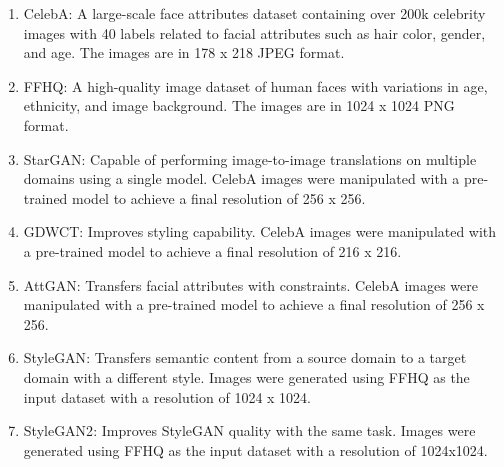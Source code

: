         \begin{enumerate}
            \item CelebA\cite{7410782}: A large-scale face attributes dataset containing over 200k celebrity images with 40 labels related to facial attributes such as hair color, gender, and age. The images are in 178 x 218 JPEG format.
            
            \item FFHQ\cite{NVlabs_ffhq_dataset}: A high-quality image dataset of human faces with variations in age, ethnicity, and image background. The images are in 1024 x 1024 PNG format.
            
            \item StarGAN\cite{choi2018stargan}: Capable of performing image-to-image translations on multiple domains using a single model. CelebA images were manipulated with a pre-trained model to achieve a final resolution of 256 x 256.
            
            \item GDWCT\cite{cho2019imagetoimage}: Improves styling capability. CelebA images were manipulated with a pre-trained model to achieve a final resolution of 216 x 216.
    
            \item AttGAN\cite{8718508}: Transfers facial attributes with constraints. CelebA images were manipulated with a pre-trained model to achieve a final resolution of 256 x 256.
        
            \item StyleGAN\cite{Karras_2020_CVPR}: Transfers semantic content from a source domain to a target domain with a different style. Images were generated using FFHQ as the input dataset with a resolution of 1024 x 1024.
        
            \item StyleGAN2\cite{inproceedings}: Improves StyleGAN quality with the same task. Images were generated using FFHQ as the input dataset with a resolution of 1024x1024.
        \end{enumerate}
        
